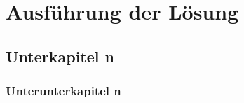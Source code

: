 \chapter{Ausführung der Lösung}\label{ch:solution}

\section{Unterkapitel n}

\subsection{Unterunterkapitel n}

